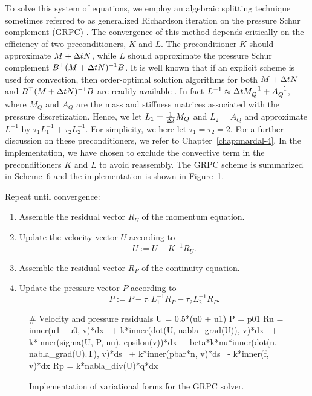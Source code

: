 To solve this system of equations, we employ an algebraic splitting
technique sometimes referred to as generalized Richardson iteration on
the pressure Schur complement (GRPC) \citep{Turek1999}. The
convergence of this method depends critically on the efficiency of two
preconditioners, $K$ and $L$. The preconditioner $K$ should
approximate $M + \Delta t N$, while $L$ should approximate the
pressure Schur complement $B^{\top} (M + \Delta t N)^{-1} B$. It is well
known that if an explicit scheme is used for convection, then
order-optimal solution algorithms for both $M + \Delta t N$ and $B^{\top} (M
+ \Delta t N)^{-1} B$ are readily available
\citep{CahouetChabard1988,Turek1999,MardalWinther2004,MardalWinther11}. In
fact $L^{-1} \approx \Delta t M_Q^{-1} + A_Q^{-1}$, where $M_Q$ and
$A_Q$ are the mass and stiffness matrices associated with the pressure
discretization. Hence, we let $L_1=\frac{1}{\Delta t} M_Q$ and
${L}_2=A_Q$ and approximate $L^{-1}$ by $\tau_1 L_1^{-1} + \tau_2
{L}_2^{-1}$. For simplicity, we here let $\tau_1 = \tau_2 = 2$.  For a
further discussion on these preconditioners, we refer to
Chapter~\ref{chap:mardal-4}. In the implementation, we have chosen to
exclude the convective term in the preconditioners $K$ and $L$ to
avoid reassembly.  The GRPC scheme is summarized in Scheme~6 and the
implementation is shown in Figure~\ref{fig:grpc_code}.

{
\item
  Repeat until convergence:

  \begin{enumerate}
  \item
    Assemble the residual vector $R_U$ of the momentum equation.
  \item
    Update the velocity vector $U$ according to
    \begin{equation}\label{eq:grpc,1}
      U := U - K^{-1} R_U.
    \end{equation}
  \item
    Assemble the residual vector $R_P$ of the continuity equation.
  \item
    Update the pressure vector $P$ according to
    \begin{equation}\label{eq:grpc,2}
      P := P - \tau_1 L_1^{-1} R_P - \tau_2 {L}_2^{-1} R_P.
    \end{equation}
  \end{enumerate}
}

\begin{figure}
\vspace*{-6pt}
\bwfig
    \begin{python}
# Velocity and pressure residuals
U = 0.5*(u0 + u1)
P = p01
Ru = inner(u1 - u0, v)*dx \
   + k*inner(dot(U, nabla_grad(U)), v)*dx \
   + k*inner(sigma(U, P, nu), epsilon(v))*dx \
   - beta*k*nu*inner(dot(n, nabla_grad(U).T), v)*ds \
   + k*inner(pbar*n, v)*ds \
   - k*inner(f, v)*dx
Rp = k*nabla_div(U)*q*dx
    \end{python}
    \caption{Implementation of variational forms for the GRPC solver.}
    \label{fig:grpc_code}
\vspace*{-6pt}
\end{figure}

